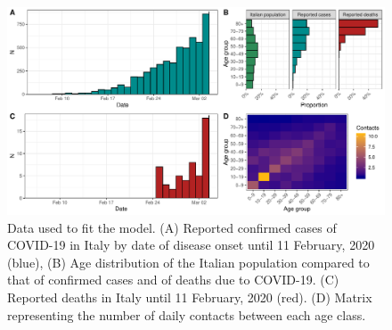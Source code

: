 \documentclass{article}
\begin{document}
	
	\begin{figure}[h]
		\centering
		\includegraphics[width=15cm]{../format_output/figures/data_italy.pdf}
		\caption{Data used to fit the model. (A) Reported confirmed cases of COVID-19 in Italy by date of disease onset until 11 February, 2020 (blue), (B) Age distribution of the Italian population compared to that of confirmed cases and of deaths due to COVID-19. (C) Reported deaths in Italy until 11 February, 2020 (red). (D) Matrix representing the number of daily contacts between each age class.}
		\label{fig:italy_case_incidence.pdf}
	\end{figure}
	
\end{document}
